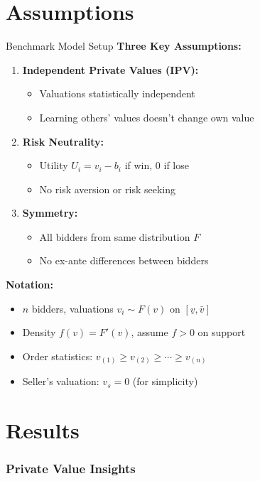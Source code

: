 \documentclass[xcolor={x11names}]{beamer}
\begin{document}
\part{Assumptions}
\begin{frame}{Benchmark Model Setup}
\textbf{Three Key Assumptions:}
\begin{enumerate}
  \item \textbf{Independent Private Values (IPV):} 
  \begin{itemize}
    \item Valuations statistically independent
    \item Learning others' values doesn't change own value
  \end{itemize}
  \item \textbf{Risk Neutrality:} 
  \begin{itemize}
    \item Utility $U_i = v_i - b_i$ if win, 0 if lose
    \item No risk aversion or risk seeking
  \end{itemize}
  \item \textbf{Symmetry:} 
  \begin{itemize}
    \item All bidders from same distribution $F$
    \item No ex-ante differences between bidders
  \end{itemize}
\end{enumerate}

\textbf{Notation:}
\begin{itemize}
  \item $n$ bidders, valuations $v_i \sim F(v)$ on $[\underline{v}, \bar{v}]$
  \item Density $f(v) = F'(v)$, assume $f > 0$ on support
  \item Order statistics: $v_{(1)} \geq v_{(2)} \geq \cdots \geq v_{(n)}$
  \item Seller's valuation: $v_s = 0$ (for simplicity)
\end{itemize}
\end{frame}

\part{Results}

\section{Private Value Insights}
\end{document}
